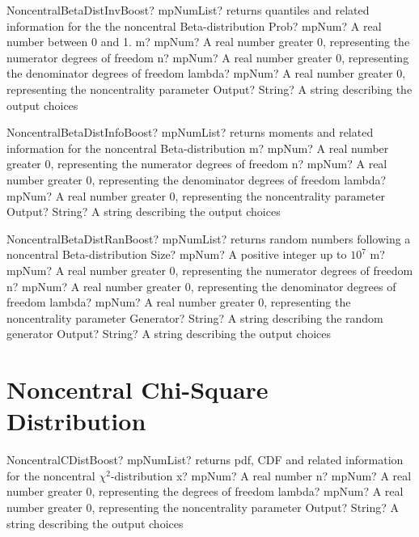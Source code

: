 \documentclass[12pt,a4paper,openany]{book}
\begin{document}
\begin{mpFunctionsExtract}
\mpFunctionFive
{NoncentralBetaDistInvBoost? mpNumList? returns quantiles and related information for the the noncentral Beta-distribution}
{Prob? mpNum? A real number between 0 and 1.}
{m? mpNum? A real number greater 0, representing the numerator  degrees of freedom}
{n? mpNum? A real number greater 0, representing the denominator degrees of freedom}
{lambda? mpNum? A real number greater 0, representing the noncentrality parameter}
{Output? String? A string describing the output choices}
\end{mpFunctionsExtract}

\begin{mpFunctionsExtract}
\mpFunctionFour
{NoncentralBetaDistInfoBoost? mpNumList? returns moments and related information for the noncentral Beta-distribution}
{m? mpNum? A real number greater 0, representing the numerator  degrees of freedom}
{n? mpNum? A real number greater 0, representing the denominator degrees of freedom}
{lambda? mpNum? A real number greater 0, representing the noncentrality parameter}
{Output? String? A string describing the output choices}
\end{mpFunctionsExtract}

\begin{mpFunctionsExtract}
\mpFunctionSix
{NoncentralBetaDistRanBoost? mpNumList? returns random numbers following a noncentral Beta-distribution}
{Size? mpNum? A positive integer up to $10^7$}
{m? mpNum? A real number greater 0, representing the numerator  degrees of freedom}
{n? mpNum? A real number greater 0, representing the denominator degrees of freedom}
{lambda? mpNum? A real number greater 0, representing the noncentrality parameter}
{Generator? String? A string describing the random generator}
{Output? String? A string describing the output choices}
\end{mpFunctionsExtract}

\section{Noncentral Chi-Square Distribution}

\begin{mpFunctionsExtract}
\mpFunctionFour
{NoncentralCDistBoost? mpNumList? returns pdf, CDF and related information for the noncentral $\chi^2$-distribution}
{x? mpNum? A real number}
{n? mpNum? A real number greater 0, representing the degrees of freedom}
{lambda? mpNum? A real number greater 0, representing the noncentrality parameter}
{Output? String? A string describing the output choices}
\end{mpFunctionsExtract}
\end{document}
